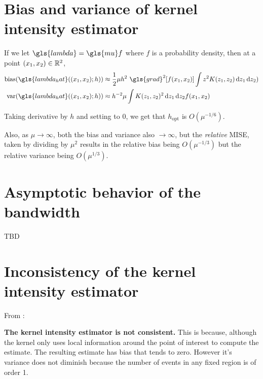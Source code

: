 \section{Bias and variance of kernel intensity estimator}
\label{sec:theory:bias_variance}

If we let $\gls{lambda} = \gls{mu} f$ where $f$ is a probability density, then at a point $(x_1, x_2) \in \mathbb{R}^2$,
\begin{align}
    \mbox{bias}(\gls{lambda_hat}(\xvec;h)) & \approx
        \frac{1}{2} \mu h^2 ~ \gls{grad}^2\!\left[ f\xvec \right]
            \int { z^2 K(z_1, z_2) \diff{z_1} \diff{z_2)} } \\
    \mbox{var}(\gls{lambda_hat}(\xvec;h)) & \approx
        h^{-2} \mu
            \int { K(z_1, z_2)^2\diff{z_1} \diff{z_2} } f\xvec
\end{align}

Taking derivative by $h$ and setting to $0$, we get that $h_{\mbox{opt}}$ is $O(\mu^{-1/6})$.

Also, as $\mu \to \infty$, both the bias and variance also $\to \infty$,
but the \textit{relative} MISE, taken by dividing by $\mu^2$ results in the relative bias being $O(\mu^{-1/3})$
but the relative variance being $O(\mu^{1/3})$.

\section{Asymptotic behavior of the bandwidth}
\label{sec:theory:bandwidth}

TBD

\section{Inconsistency of the kernel intensity estimator}
\label{sec:theory:inconsistency}

From \citet{guan2008consistent}:

{
\color{red}
\textbf{The kernel intensity estimator is not consistent.}
This is because, although the kernel only uses local information around the point of interest to compute the estimate.
The resulting estimate has bias that tends to zero.
However it's variance does not diminish because the number of events in any fixed region is of order 1.
}

